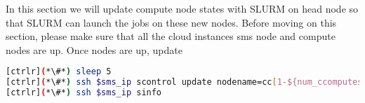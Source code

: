         In this section we will update compute node states with SLURM on head node so that SLURM can launch the jobs on these new nodes.
        Before moving on this section, please make sure that all the cloud instances sms node and compute nodes are up. Once nodes are up, update 



\begin{lstlisting}[language=bash,keywords={}]
[ctrlr](*\#*) sleep 5
[ctrlr](*\#*) ssh $sms_ip scontrol update nodename=cc[1-${num_ccomputes}] state=idle
[ctrlr](*\#*) ssh $sms_ip sinfo
\end{lstlisting}
